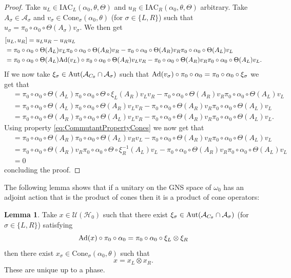 \documentclass[12pt,a4paper,twoside]{article}
\let\originalleft\left
\let\originalright\right
\renewcommand{\left}{\mathopen{}\mathclose\bgroup\originalleft}
\renewcommand{\right}{\aftergroup\egroup\originalright}
\newcommand{\UU}{\mathcal U}
\newcommand{\HH}{\mathcal H}
\renewcommand{\AA}{\mathcal A}
\newcommand{\Ad}[1]{\textrm{Ad}\left(#1\right)}
\newcommand{\Aut}[1]{\textrm{Aut}\left(#1\right)}
\theoremstyle{definition}
\newtheorem{lemma}[theorem]{Lemma}
\numberwithin{equation}{section}
\begin{document}
\begin{proof}
	Take $u_L\in\textrm{IAC}_L(\alpha_0,\theta,\Theta)$ and $u_R\in\textrm{IAC}_R(\alpha_0,\theta,\Theta)$ arbitrary. Take $A_\sigma\in\AA_\sigma$ and $v_\sigma\in\textrm{Cone}_\sigma(\alpha_0,\theta)$ (for $\sigma\in\{L,R\}$) such that $u_\sigma=\pi_0\circ\alpha_0\circ\Theta(A_\sigma)v_\sigma$. We then get
	\begin{align}
		&[u_L,u_R]=u_Lu_R-u_Ru_L\\
		&=\pi_0\circ\alpha_0\circ\Theta(A_L)v_L\pi_0\circ\alpha_0\circ\Theta(A_R)v_R-\pi_0\circ\alpha_0\circ\Theta(A_R)v_R\pi_0\circ\alpha_0\circ\Theta(A_L)v_L\\
		&=\pi_0\circ\alpha_0\circ\Theta(A_L)\Ad{v_L}\circ\pi_0\circ\alpha_0\circ\Theta(A_R)v_Lv_R-\pi_0\circ\alpha_0\circ\Theta(A_R)v_R\pi_0\circ\alpha_0\circ\Theta(A_L)v_L.
	\end{align}
	If we now take $\xi_\sigma\in\Aut{\AA_{C_\theta}\cap\AA_\sigma}$ such that $\Ad{v_\sigma}\circ\pi_0\circ\alpha_0=\pi_0\circ\alpha_0\circ\xi_\sigma$ we get that
	\begin{align}
		&=\pi_0\circ\alpha_0\circ\Theta(A_L)\pi_0\circ\alpha_0\circ\Theta\circ\xi_L(A_R)v_Lv_R-\pi_0\circ\alpha_0\circ\Theta(A_R)v_R\pi_0\circ\alpha_0\circ\Theta(A_L)v_L\\
		&=\pi_0\circ\alpha_0\circ\Theta(A_L)\pi_0\circ\alpha_0\circ\Theta(A_R)v_Lv_R-\pi_0\circ\alpha_0\circ\Theta(A_R)v_R\pi_0\circ\alpha_0\circ\Theta(A_L)v_L\\
		&=\pi_0\circ\alpha_0\circ\Theta(A_R)\pi_0\circ\alpha_0\circ\Theta(A_L)v_Lv_R-\pi_0\circ\alpha_0\circ\Theta(A_R)v_R\pi_0\circ\alpha_0\circ\Theta(A_L)v_L.
	\end{align}
	Using property \eqref{eq:CommutantPropertyCones} we now get that
	\begin{align}
		&=\pi_0\circ\alpha_0\circ\Theta(A_R)\pi_0\circ\alpha_0\circ\Theta(A_L)v_Rv_L-\pi_0\circ\alpha_0\circ\Theta(A_R)v_R\pi_0\circ\alpha_0\circ\Theta(A_L)v_L\\
		&=\pi_0\circ\alpha_0\circ\Theta(A_R)v_R\pi_0\circ\alpha_0\circ\Theta\circ\xi_R^{-1}(A_L)v_L-\pi_0\circ\alpha_0\circ\Theta(A_R)v_R\pi_0\circ\alpha_0\circ\Theta(A_L)v_L\\
		&=0
	\end{align}
	concluding the proof.
\end{proof}
The following lemma shows that if a unitary on the GNS space of $\omega_0$ has an adjoint action that is the product of cones then it is a product of cone operators:
\begin{lemma}\label{lem:UsingIrreducibilityAndWignerTheorem}
	Take $x\in\UU(\HH_0)$ such that there exist $\xi_\sigma\in\Aut{\AA_{C_\theta}\cap\AA_\sigma}$ (for $\sigma\in\{L,R\}$) satisfying
	\begin{equation}
		\Ad{x}\circ\pi_0\circ\alpha_0=\pi_0\circ\alpha_0\circ\xi_L\otimes\xi_R
	\end{equation}
	then there exist $x_\sigma\in\textrm{Cone}_\sigma(\alpha_0,\theta)$ such that
	\begin{equation}
		x=x_L\otimes x_R.
	\end{equation}
	These are unique up to a phase.
\end{lemma}
\end{document}
